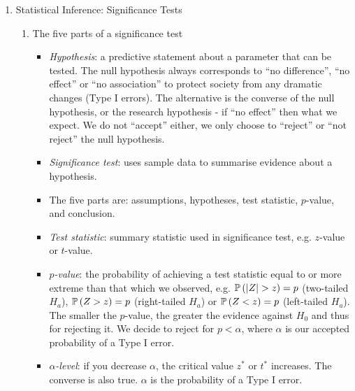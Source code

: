 \begin{enumerate}[label=\textbf{\S~\arabic*}, ref=\S~\arabic*]
    \item Statistical Inference: Significance Tests
    \begin{enumerate}
        \item The five parts of a significance test
        \begin{itemize}
            \item \textit{Hypothesis}: a predictive statement about a parameter that can be tested. The null hypothesis always corresponds to ``no difference'', ``no effect'' or ``no association'' to protect society from any dramatic changes (Type I errors). The alternative is the converse of the null hypothesis, or the research hypothesis - if ``no effect'' then what we expect. We do not ``accept'' either, we only choose to ``reject'' or ``not reject'' the null hypothesis.
            \item \textit{Significance test}: uses sample data to summarise evidence about a hypothesis.
            \item The five parts are: assumptions, hypotheses, test statistic, $p$-value, and conclusion.
            \item \textit{Test statistic}: summary statistic used in significance test, e.g. $z$-value or $t$-value.
            \item \textit{$p$-value}: the probability of achieving a test statistic equal to or more extreme than that which we observed, e.g. $\operatorname{\mathbb{P}}{\left( \left\vert Z\right\vert>z\right)} = p$ (two-tailed $H_a$), $\operatorname{\mathbb{P}}{\left( Z>z\right)}=p$ (right-tailed $H_a$) or $\operatorname{\mathbb{P}}{\left( Z<z\right)}=p$ (left-tailed $H_a$). The smaller the $p$-value, the greater the evidence against $H_0$ and thus for rejecting it. We decide to reject for $p< \alpha$, where $\alpha$ is our accepted probability of a Type I error.
            \item \textit{$\alpha$-level}: if you decrease $\alpha$, the critical value $z^*$ or $t^*$ increases. The converse is also true. $\alpha$ is the probability of a Type I error.
        \end{itemize}
        

\end{enumerate}
\end{enumerate}

